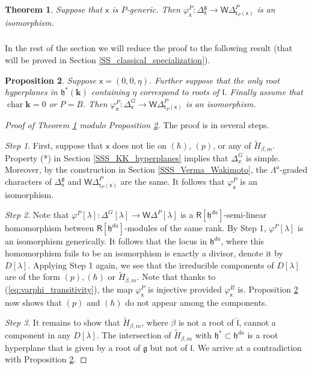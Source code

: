 \documentclass{amsart}
\newtheorem{Thm}{Theorem}[subsection]
\newtheorem{Prop}[Thm]{Proposition}
\theoremstyle{definition}
\newcommand{\sss}{\subsubsection{}}
\newcommand{\Ring}{\mathsf{R}}
\newcommand{\g}{\mathfrak{g}}
\newcommand{\h}{\mathfrak{h}}
\newcommand{\lf}{\mathfrak{l}}
\newcommand{\bk}{\mathbf{k}}
\newcommand{\WakDelta}{\mathsf{W}\Delta}
\newcommand{\sx}{\mathsf{x}}
\numberwithin{equation}{section}
\begin{document}
\begin{Thm}\label{Thm:Verma_vs_Wakimoto}
Suppose that $\sx$ is $P$-generic. Then $\varphi^P_{\sx}:\Delta^\g_{\sx}\rightarrow \WakDelta^P_{\mathsf{t}_P(\sx)}$ is an isomorphism. 
\end{Thm}

\sss 
In the rest of the section we will reduce the proof to the following result (that will be proved in Section \ref{SS_classical_specialization}). 

\begin{Prop}\label{Prop:iso_classical}
Suppose  $\sx=(0,0,\eta)$. Further suppose that the only root hyperplanes in $\h^*(\bk)$ containing $\eta$ correspond to roots of $\lf$. 
Finally assume that $\operatorname{char}\bk=0$ or $P=B$.
Then $\varphi_{\sx}^P: \Delta^G_{\sx}\rightarrow \WakDelta^P_{\mathsf{t}_P(\sx)}$ is an isomorphism.  
\end{Prop}

\begin{proof}[Proof of Theorem \ref{Thm:Verma_vs_Wakimoto} modulo Proposition \ref{Prop:iso_classical}]
The proof is in several steps. 

{\it Step 1}. First, suppose that $\sx$ does not lie on $(\hbar)$, $(p)$, or 
any of $\tilde{H}_{\beta,m}$. Property (*) in Section \ref{SSS_KK_hyperplanes}
implies that $\Delta^{G}_x$ is simple. Moreover, by the construction in Section \ref{SSS_Verma_Wakimoto}, the $\Lambda^a$-graded characters of 
$\Delta^\g_{\sx}$ and $\WakDelta^P_{\mathsf{t}_P(\sx)}$ are the same. It follows that 
$\varphi^P_{\sx}$ is an isomorphism. 

{\it Step 2}. 
Note that $\varphi^P[\lambda]: \Delta^G[\lambda]\rightarrow 
\WakDelta^P[\lambda]$ is a $\Ring[\h^{da}]$-semi-linear homomorphism between $\Ring[\h^{da}]$-modules of the same rank. By Step 1, $\varphi^P[\lambda]$ is an isomorphism generically. 
It follows that the locus in $\h^{da}$, where this homomorphism fails to be an isomorphism is exactly a divisor, denote it by $D[\lambda]$. Applying Step 1 again, we see that the irreducible components of $D[\lambda]$ are of the form $(p),(\hbar)$ or $\tilde{H}_{\beta,m}$. Note that thanks to (\ref{eq:varphi_transitivity}), the map $\varphi^P_{\sx}$ is injective provided $\varphi^B_{\sx}$ is.
Proposition \ref{Prop:iso_classical} now shows that $(p)$ and $(\hbar)$ do not appear among the components. 

{\it Step 3}. It remains to show that $\tilde{H}_{\beta,m}$, where $\beta$ is not a root of $\hat{\lf}$, cannot a component in any $D[\lambda]$. The intersection of $\tilde{H}_{\beta,m}$
with $\h^*\subset \h^{da}$ is a root hyperplane that is given by a root of $\g$ but not of $\lf$. 
We arrive at a contradiction with Proposition \ref{Prop:iso_classical}.
\end{proof}
\end{document}
